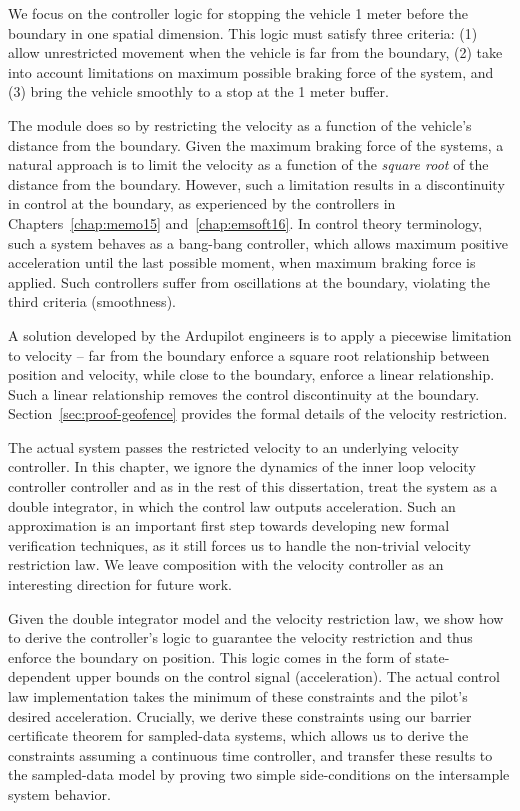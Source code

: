 We focus on the controller logic for stopping the vehicle 1 meter before
the boundary in one spatial dimension. This logic must satisfy three
criteria: (1) allow unrestricted movement when the vehicle is far from the
boundary, (2) take into account limitations on maximum possible braking
force of the system, and (3) bring the vehicle smoothly to a stop at the 1
meter buffer.

The module does so by restricting the velocity as a function of the
vehicle's distance from the boundary. Given the maximum braking force of
the systems, a natural approach is to limit the velocity as a function of
the \emph{square root} of the distance from the boundary. However, such a
limitation results in a discontinuity in control at the boundary, as
experienced by the controllers in Chapters~\ref{chap:memo15}
and~\ref{chap:emsoft16}. In control theory terminology, such a system
behaves as a bang-bang controller, which allows maximum positive
acceleration until the last possible moment, when maximum braking force is
applied. Such controllers suffer from oscillations at the boundary,
violating the third criteria (smoothness).

A solution developed by the Ardupilot engineers is to apply a piecewise
limitation to velocity -- far from the boundary enforce a square root
relationship between position and velocity, while close to the boundary,
enforce a linear relationship. Such a linear relationship removes the
control discontinuity at the boundary. Section~\ref{sec:proof-geofence}
provides the formal details of the velocity restriction.

The actual system passes the restricted velocity to an underlying velocity
controller. In this chapter, we ignore the dynamics of the inner loop
velocity controller controller and as in the rest of this dissertation,
treat the system as a double integrator, in which the control law outputs
acceleration. Such an approximation is an important first step towards
developing new formal verification techniques, as it still forces us to
handle the non-trivial velocity restriction law.  We leave composition with
the velocity controller as an interesting direction for future work.

Given the double integrator model and the velocity restriction law, we show
how to derive the controller's logic to guarantee the velocity restriction
and thus enforce the boundary on position. This logic comes in the form of
state-dependent upper bounds on the control signal (acceleration). The
actual control law implementation takes the minimum of these constraints
and the pilot's desired acceleration. Crucially, we derive these
constraints using our barrier certificate theorem for sampled-data systems,
which allows us to derive the constraints assuming a continuous time
controller, and transfer these results to the sampled-data model by proving
two simple side-conditions on the intersample system behavior.

